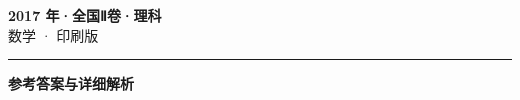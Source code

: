 \documentclass[zihao=5, a4paper]{ctexart}
\begin{document}
\begin{center}
  {\Large\bfseries 2017 年·全国Ⅱ卷·理科}\\[4pt]
  {\large 数学 · 印刷版}
\end{center}
\medskip
{}

\par\bigskip\hrule\bigskip
{}
\begin{center}{\large\bfseries 参考答案与详细解析}\end{center}
\smallskip

\end{document}
